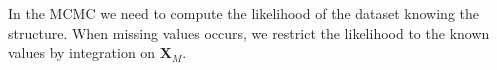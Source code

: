 \documentclass[12pt,a4paper]{report}
\begin{document}
		In the MCMC we need to compute the likelihood of the dataset knowing the structure. When missing values occurs, we restrict the likelihood to the known values by integration on $\boldsymbol{X}_M$.
				 		
%		
\end{document}
